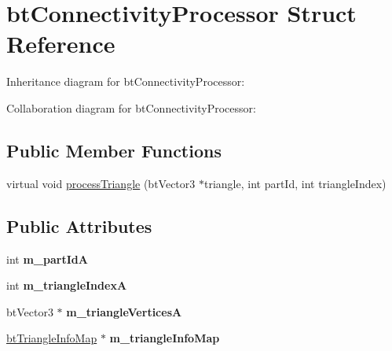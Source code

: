 \hypertarget{structbt_connectivity_processor}{\section{bt\+Connectivity\+Processor Struct Reference}
\label{structbt_connectivity_processor}
}


Inheritance diagram for bt\+Connectivity\+Processor\+:


Collaboration diagram for bt\+Connectivity\+Processor\+:
\subsection*{Public Member Functions}
\begin{DoxyCompactItemize}
\item 
virtual void \hyperlink{structbt_connectivity_processor_a5d5f11a5ad2bc3b3bfad6882b42e18de}{process\+Triangle} (bt\+Vector3 $\ast$triangle, int part\+Id, int triangle\+Index)
\end{DoxyCompactItemize}
\subsection*{Public Attributes}
\begin{DoxyCompactItemize}
\item 
\hypertarget{structbt_connectivity_processor_aff835524c084797ad3e0757f5728cd9d}{int {\bfseries m\+\_\+part\+Id\+A}}\label{structbt_connectivity_processor_aff835524c084797ad3e0757f5728cd9d}

\item 
\hypertarget{structbt_connectivity_processor_a5eb429bc81d0605465e89d18c5c79252}{int {\bfseries m\+\_\+triangle\+Index\+A}}\label{structbt_connectivity_processor_a5eb429bc81d0605465e89d18c5c79252}

\item 
\hypertarget{structbt_connectivity_processor_a4d88edcd11ca7e612bb1c9fd09e15e86}{bt\+Vector3 $\ast$ {\bfseries m\+\_\+triangle\+Vertices\+A}}\label{structbt_connectivity_processor_a4d88edcd11ca7e612bb1c9fd09e15e86}

\item 
\hypertarget{structbt_connectivity_processor_a13897d98550b47a15fdfb907fed5c007}{\hyperlink{structbt_triangle_info_map}{bt\+Triangle\+Info\+Map} $\ast$ {\bfseries m\+\_\+triangle\+Info\+Map}}\label{structbt_connectivity_processor_a13897d98550b47a15fdfb907fed5c007}

\end{DoxyCompactItemize}


